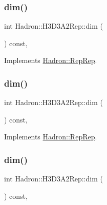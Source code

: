 \subsubsection{\texorpdfstring{dim()}{dim()}\hspace{0.1cm}{\footnotesize\ttfamily [3/5]}}
{\footnotesize\ttfamily int Hadron\+::\+H3\+D3\+A2\+Rep\+::dim (\begin{DoxyParamCaption}{ }\end{DoxyParamCaption}) const\hspace{0.3cm}{\ttfamily [inline]}, {\ttfamily [virtual]}}



Implements \mbox{\hyperlink{structHadron_1_1RepRep_a92c8802e5ed7afd7da43ccfd5b7cd92b}{Hadron\+::\+Rep\+Rep}}.

\mbox{\label{structHadron_1_1H3D3A2Rep_ab7b4c300c476b1e9771638ef5eee9e7e}} 
\subsubsection{\texorpdfstring{dim()}{dim()}\hspace{0.1cm}{\footnotesize\ttfamily [4/5]}}
{\footnotesize\ttfamily int Hadron\+::\+H3\+D3\+A2\+Rep\+::dim (\begin{DoxyParamCaption}{ }\end{DoxyParamCaption}) const\hspace{0.3cm}{\ttfamily [inline]}, {\ttfamily [virtual]}}



Implements \mbox{\hyperlink{structHadron_1_1RepRep_a92c8802e5ed7afd7da43ccfd5b7cd92b}{Hadron\+::\+Rep\+Rep}}.

\mbox{\label{structHadron_1_1H3D3A2Rep_ab7b4c300c476b1e9771638ef5eee9e7e}} 
\subsubsection{\texorpdfstring{dim()}{dim()}\hspace{0.1cm}{\footnotesize\ttfamily [5/5]}}
{\footnotesize\ttfamily int Hadron\+::\+H3\+D3\+A2\+Rep\+::dim (\begin{DoxyParamCaption}{ }\end{DoxyParamCaption}) const\hspace{0.3cm}{\ttfamily [inline]}, {\ttfamily [virtual]}}



